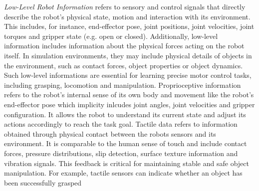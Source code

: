 \textit{Low-Level Robot Information} 
refers to sensory and control signals that directly describe the robot's physical state, motion and interaction with its environment. This includes, for instance, end-effector pose, joint positions, joint velocities, joint torques and gripper state (e.g. open or closed). Additionally, low-level information includes information about the physical forces acting on the robot itself. In simulation environments, they may include physical details of objects in the environment, such as contact forces, object properties or object dynamics.
Such low-level informations are essential for learning precise motor control tasks, including grasping, locomotion and manipulation.
Proprioceptive information refers to the robot's internal sense of its own body and movement like the robot's end-effector pose which implicity inlcudes joint angles, joint velocities and gripper configuration. It allows the robot to understand its current state and adjust its actions accordingly to reach the task goal.
Tactile data refers to information obtained through physical contact between the robots sensors and its environment.
It is comparable to the human sense of touch and include contact forces, pressure distributions, slip detection, surface texture information and vibration signals. This feedback is critical for maintaining stable and safe object manipulation. For example, tactile sensors can indicate whether an object has been successfully grasped 



